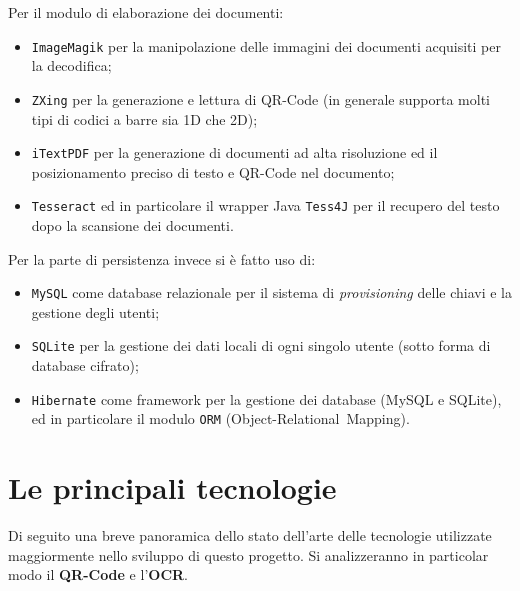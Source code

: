 Per il modulo di elaborazione dei documenti:
\begin{itemize}
	\item \texttt{ImageMagik} per la manipolazione delle immagini dei documenti acquisiti per la decodifica;
	\item \texttt{ZXing} per la generazione e lettura di QR-Code (in generale supporta molti tipi di codici a barre sia 1D che 2D);
	\item \texttt{iTextPDF} per la generazione di documenti ad alta risoluzione ed il posizionamento preciso di testo e QR-Code nel documento;
	\item \texttt{Tesseract} ed in particolare il wrapper Java \texttt{Tess4J} per il recupero del testo dopo la scansione dei documenti.
\end{itemize}

Per la parte di persistenza invece si è fatto uso di:
\begin{itemize}
	\item \texttt{MySQL} come database relazionale per il sistema di \emph{provisioning} delle chiavi e la gestione degli utenti;
	\item \texttt{SQLite} per la gestione dei dati locali di ogni singolo utente (sotto forma di database cifrato);
	\item \texttt{Hibernate} come framework per la gestione dei database (MySQL e SQLite), ed in particolare il modulo \texttt{ORM} (Object-Relational~Mapping).
\end{itemize}

\section{Le principali tecnologie}
Di seguito una breve panoramica dello stato dell'arte delle tecnologie utilizzate maggiormente nello sviluppo di questo progetto.
Si analizzeranno in particolar modo il \textbf{QR-Code} e l'\textbf{OCR}.
